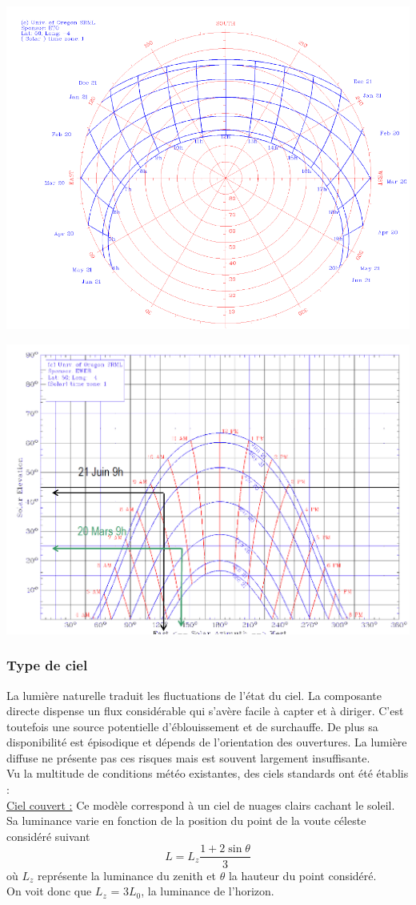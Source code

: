 \documentclass[11pt]{report}
\begin{document}
\vspace{5mm}
\begin{minipage}{0.5\linewidth}
\centering
\includegraphics[width=0.65\linewidth]{pol}
\end{minipage}
\begin{minipage}{0.5\linewidth}
\centering
\includegraphics[width=0.65\linewidth]{cart}
\end{minipage}


\subsubsection{Type de ciel}
La lumière naturelle traduit les fluctuations de l'état du ciel. La composante directe dispense un flux considérable qui s'avère facile à capter et à diriger. C'est toutefois une source potentielle d'éblouissement et de surchauffe. De plus sa disponibilité est épisodique et dépends de l'orientation des ouvertures. La lumière diffuse ne présente pas ces risques mais est souvent largement insuffisante.\\


Vu la multitude de conditions météo existantes, des ciels standards ont été établis :\\


\underline{Ciel couvert :} Ce modèle correspond à un ciel de nuages clairs cachant le soleil. Sa luminance varie en fonction de la position du point de la voute céleste considéré suivant
$$L =L_z \frac{1+2 \sin \theta}{3}$$
où $L_z$ représente la luminance du zenith et $\theta$ la hauteur du point considéré. \\On voit donc que $L_z$ = $3 L_0$, la luminance de l'horizon.
\end{document}
